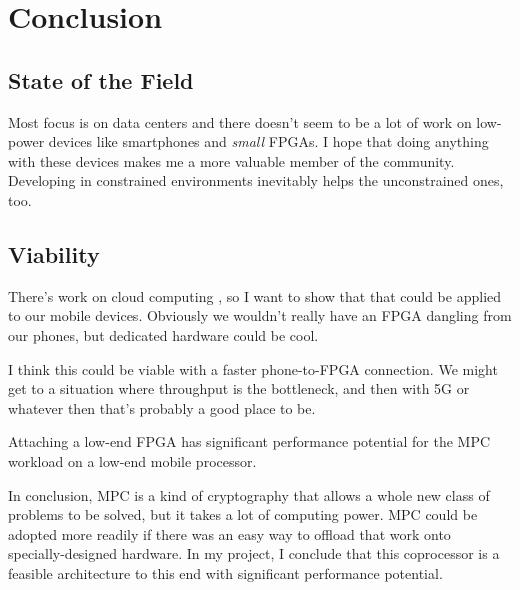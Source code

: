 \section{Conclusion}
\subsection{State of the Field}
Most focus is on data centers and there doesn't seem to be a lot of work on low-power devices like smartphones and \textit{small} FPGAs. I hope that doing anything with these devices makes me a more valuable member of the community. Developing in constrained environments inevitably helps the unconstrained ones, too.

\subsection{Viability}
There's work on cloud computing , so I want to show that that could be applied to our mobile devices. Obviously we wouldn't really have an FPGA dangling from our phones, but dedicated hardware could be cool. 

I think this could be viable with a faster phone-to-FPGA connection. We might get to a situation where throughput is the bottleneck, and then with 5G or whatever then that's probably a good place to be.

Attaching a low-end FPGA has significant performance potential for the MPC workload on a low-end mobile processor.

In conclusion, MPC is a kind of cryptography that allows a whole new class of problems to be solved, but it takes a lot of computing power. MPC could be adopted more readily if there was an easy way to offload that work onto specially-designed hardware. In my project, I conclude that this coprocessor is a feasible architecture to this end with significant performance potential.
